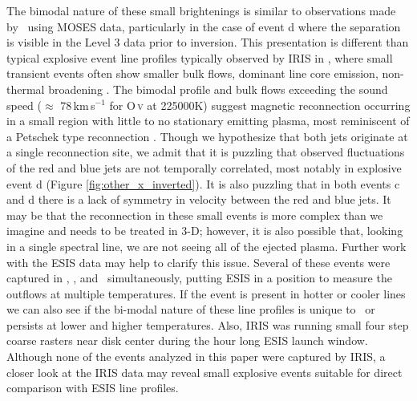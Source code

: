 	The bimodal nature of these small brightenings is similar to observations made by \citet{Rust2019} \heii \ using MOSES data, particularly in the case of event d where the separation is visible in the Level 3 data prior to inversion.
	This presentation is different than typical explosive event line profiles typically observed by IRIS in \siiv, where small transient events often show smaller bulk flows, dominant line core emission, non-thermal broadening \citep{Innes2015,Chitta2017}. 
	The bimodal profile and bulk flows exceeding the sound speed ($\approx$ 78\,km\,s$^{-1}$ for O\,\textsc{v} at 225000K) suggest magnetic reconnection occurring in a small region with little to no stationary emitting plasma, most reminiscent of a Petschek type reconnection \citep{Innes1999}.
	Though we hypothesize that both jets originate at a single reconnection site, we admit that it is puzzling that observed fluctuations of the red and blue jets are not temporally correlated, most notably in explosive event d (Figure \ref{fig:other_x_inverted}).
    It is also puzzling that in both events c and d there is a lack of symmetry in velocity between the red and blue jets.
	It may be that the reconnection in these small events is more complex than we imagine and needs to be treated in 3-D; however, it is also possible that, looking in a single spectral line, we are not seeing all of the ejected plasma. 
	Further work with the ESIS data may help to clarify this issue.
	Several of these events were captured in \hei, \mgxbright, and \ov \ simultaneously, putting ESIS in a position to measure the outflows at multiple temperatures. 
	If the event is present in hotter or cooler lines we can also see if the bi-modal nature of these line profiles is unique to \ov \ or persists at lower and higher temperatures.
	Also, IRIS was running small four step coarse rasters near disk center during the hour long ESIS launch window.
	Although none of the events analyzed in this paper were captured by IRIS, a closer look at the IRIS data may reveal small explosive events suitable for direct comparison with ESIS line profiles.
	
